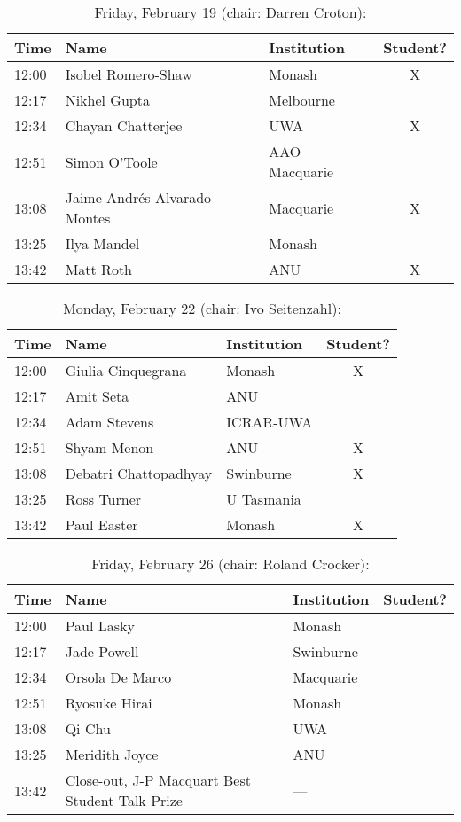 \documentclass[amsmath,onecolumn]{revtex4-1}
\begin{document}
\begin{table}[!htbp]
	\centering
	\caption{Friday, February 19 (chair: Darren Croton):}
\begin{tabular}{| l | l | l | c |}
	\hline
	Time & Name  & Institution & Student? \\ 		
	\hline
	12:00 &  Isobel	Romero-Shaw & Monash & X\\
	12:17 & Nikhel	Gupta  & Melbourne & \\
	12:34 & Chayan	Chatterjee & UWA  & X \\
	12:51 & Simon	O'Toole &	AAO Macquarie  & \\
	13:08 & Jaime Andr\'{e}s	Alvarado Montes &  Macquarie & X\\
	13:25 & Ilya Mandel & Monash & \\
	13:42 & Matt	Roth & ANU & X\\
	\hline
\end{tabular}
\end{table}

\begin{table}[!htbp]
	\centering
	\caption{Monday, February 22 (chair: Ivo Seitenzahl):}
\begin{tabular}{| l | l | l | c |}
	\hline
	Time & Name  & Institution & Student? \\ 		
	\hline
	12:00 & Giulia	Cinquegrana & Monash & X\\
	12:17 & Amit 	Seta & ANU  & \\
	12:34 & Adam	Stevens & ICRAR-UWA &\\
	12:51 & Shyam	Menon & ANU & X\\
	13:08 & Debatri 	Chattopadhyay & Swinburne  & X \\
	13:25 & Ross	Turner  & U Tasmania  & \\
	13:42 & Paul	Easter & Monash & X\\
	\hline
\end{tabular}
\end{table}

\begin{table}[!htbp]
	\centering
	\caption{Friday, February 26 (chair: Roland Crocker):}
\begin{tabular}{| l | l | l | c |}
	\hline
	Time & Name  & Institution & Student? \\ 		
	\hline
	12:00 & Paul	Lasky & Monash & \\
	12:17 & Jade	Powell & Swinburne & \\
	12:34 & Orsola	De Marco & Macquarie & \\
	12:51 & Ryosuke	Hirai  & Monash & \\
	13:08 & Qi	Chu & UWA & \\
	13:25 & Meridith	Joyce & ANU  & \\
	13:42 & Close-out, J-P Macquart Best Student Talk Prize & --- & \\
	\hline
\end{tabular}
\end{table}
\end{document}
